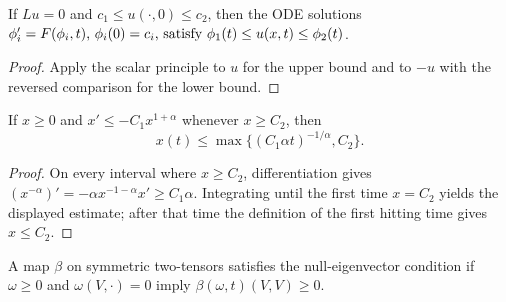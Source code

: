 \begin{theorem}
\label{thm:chow-ii-scalar-two-sided}
If $Lu=0$ and $c_1\le u(\cdot,0)\le c_2$, then the ODE solutions
\(\phi_i'=F(\phi_i,t)$, $\phi_i(0)=c_i$, satisfy
\(\phi_1(t)\le u(x,t)\le\phi_2(t)\).
\end{theorem}
\begin{proof}
Apply the scalar principle to $u$ for the upper bound and to $-u$ with the
reversed comparison for the lower bound.
\end{proof}

\begin{example}
\label{ex:chow-ii-ode-decay}
If $x\ge0$ and $x'\le-C_1x^{1+\alpha}$ whenever $x\ge C_2$, then
\[
x(t)\le\max\{(C_1\alpha t)^{-1/\alpha},C_2\}.
\]
\end{example}
\begin{proof}
On every interval where $x\ge C_2$, differentiation gives
\((x^{-\alpha})'=-\alpha x^{-1-\alpha}x'\ge C_1\alpha\).  Integrating until
the first time $x=C_2$ yields the displayed estimate; after that time the
definition of the first hitting time gives $x\le C_2$.
\end{proof}

\begin{definition}
\label{def:chow-ii-null-eigenvector}
A map $\beta$ on symmetric two-tensors satisfies the null-eigenvector condition
if $\omega\ge0$ and $\omega(V,\cdot)=0$ imply $\beta(\omega,t)(V,V)\ge0$.
\end{definition}

